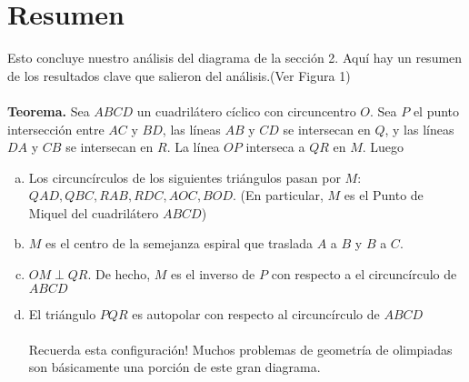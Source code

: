 \documentclass[11pt, a4paper]{article}
\begin{document}
	\setcounter{section}{7}
	\section{Resumen}
	Esto concluye nuestro an\'alisis del diagrama de la secci\'on 2. Aqu\'i hay un resumen de los resultados clave que salieron del an\'alisis.(Ver Figura 1)
	\\\\
	\textbf{Teorema.} Sea $ABCD$ un cuadril\'atero c\'iclico con circuncentro $O$. Sea $P$ el punto intersecci\'on entre $AC$ y $BD$, las l\'ineas $AB$ y $CD$ se intersecan en $Q$, y las l\'ineas $DA$ y $CB$ se intersecan en $R$. La l\'inea $OP$ interseca a $QR$ en $M$. Luego
	\begin{enumerate}[(a)]
		\item Los circunc\'irculos de los siguientes tri\'angulos pasan por $M$: $QAD, QBC, RAB, RDC ,AOC, BOD.$ (En particular, $M$ es el Punto de Miquel del cuadril\'atero $ABCD$)
		\item $M$ es el centro de la semejanza espiral que traslada $A$ a $B$ y $B$ a $C$.
		\item $OM \perp QR$. De hecho, $M$ es el inverso de $P$ con respecto a el circunc\'irculo de $ABCD$
		\item El tri\'angulo $PQR$ es autopolar con respecto al circunc\'irculo de $ABCD$
		\\\\
		Recuerda esta configuraci\'on! Muchos problemas de geometr\'ia de olimpiadas son b\'asicamente una porci\'on de este gran diagrama.
	\end{enumerate}
\end{document}
